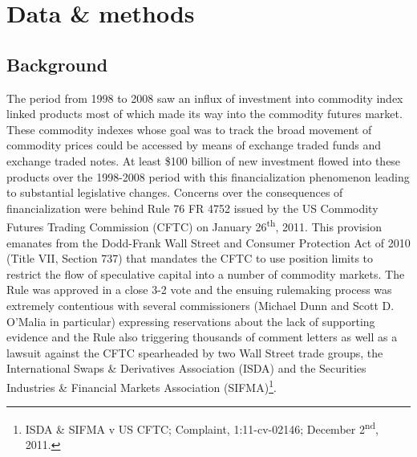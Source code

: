 \documentclass[]{elsarticle} %
\begin{document}
\hypertarget{data-methods}{%
\section{Data \& methods}\label{data-methods}}

\hypertarget{background}{%
\subsection{Background}\label{background}}

The period from 1998 to 2008 saw an influx of investment into commodity
index linked products most of which made its way into the commodity
futures market. These commodity indexes whose goal was to track the
broad movement of commodity prices could be accessed by means of
exchange traded funds and exchange traded notes. At least \$100 billion
of new investment flowed into these products over the 1998-2008 period
with this financialization phenomenon leading to substantial legislative
changes. Concerns over the consequences of financialization were behind
Rule 76 FR 4752 issued by the US Commodity Futures Trading Commission
(CFTC) on January 26\textsuperscript{th}, 2011. This provision emanates
from the Dodd-Frank Wall Street and Consumer Protection Act of 2010
(Title VII, Section 737) that mandates the CFTC to use position limits
to restrict the flow of speculative capital into a number of commodity
markets. The Rule was approved in a close 3-2 vote and the ensuing
rulemaking process was extremely contentious with several commissioners
(Michael Dunn and Scott D. O'Malia in particular) expressing
reservations about the lack of supporting evidence and the Rule also
triggering thousands of comment letters as well as a lawsuit against the
CFTC spearheaded by two Wall Street trade groups, the International
Swaps \& Derivatives Association (ISDA) and the Securities Industries \&
Financial Markets Association (SIFMA)\footnote{ISDA \& SIFMA v US CFTC;
  Complaint, 1:11-cv-02146; December 2\textsuperscript{nd}, 2011.}.
\end{document}
